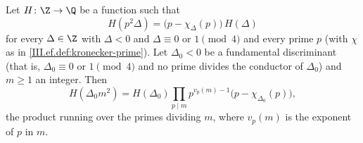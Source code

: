 Let $H\colon\Z\to\Q$ be a function such that
\[
  H(p^2\Delta)=\bigl(p-\chi_\Delta(p)\bigr)\,H(\Delta)
\]
for every $\Delta\in\Z$ with $\Delta<0$ and $\Delta\equiv0$ or $1\pmod4$ and every prime $p$ (with $\chi$ as in \cref{III.ef.def:kronecker-prime}).
Let $\Delta_0<0$ be a fundamental discriminant (that is, $\Delta_0\equiv0$ or $1\pmod4$ and no prime divides the conductor of $\Delta_0$) and $m\ge1$
an integer. Then
\[
  H(\Delta_0m^2)=H(\Delta_0)\prod_{p\mid m}p^{v_p(m)-1}\bigl(p-\chi_{\Delta_0}(p)\bigr),
\]
the product running over the primes dividing $m$, where $v_p(m)$ is the exponent of $p$ in $m$.
